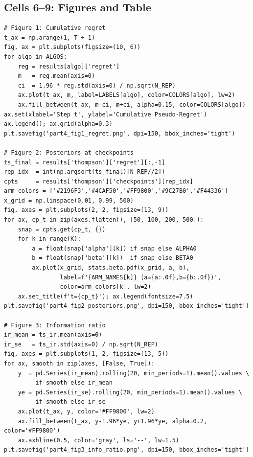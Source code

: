 \documentclass[11pt, letterpaper]{article}
\begin{document}
\subsection*{Cells 6--9: Figures and Table}
\begin{lstlisting}
# Figure 1: Cumulative regret
t_ax = np.arange(1, T + 1)
fig, ax = plt.subplots(figsize=(10, 6))
for algo in ALGOS:
    reg = results[algo]['regret']
    m   = reg.mean(axis=0)
    ci  = 1.96 * reg.std(axis=0) / np.sqrt(N_REP)
    ax.plot(t_ax, m, label=LABELS[algo], color=COLORS[algo], lw=2)
    ax.fill_between(t_ax, m-ci, m+ci, alpha=0.15, color=COLORS[algo])
ax.set(xlabel='Step t', ylabel='Cumulative Pseudo-Regret')
ax.legend(); ax.grid(alpha=0.3)
plt.savefig('part4_fig1_regret.png', dpi=150, bbox_inches='tight')

# Figure 2: Posteriors at checkpoints
ts_final = results['thompson']['regret'][:,-1]
rep_idx  = int(np.argsort(ts_final)[N_REP//2])
cpts     = results['thompson']['checkpoints'][rep_idx]
arm_colors = ['#2196F3','#4CAF50','#FF9800','#9C27B0','#F44336']
x_grid = np.linspace(0.01, 0.99, 500)
fig, axes = plt.subplots(2, 2, figsize=(13, 9))
for ax, cp_t in zip(axes.flatten(), [50, 100, 200, 500]):
    snap = cpts.get(cp_t, {})
    for k in range(K):
        a = float(snap['alpha'][k]) if snap else ALPHA0
        b = float(snap['beta'][k])  if snap else BETA0
        ax.plot(x_grid, stats.beta.pdf(x_grid, a, b),
                label=f'{ARM_NAMES[k]} (a={a:.0f},b={b:.0f})',
                color=arm_colors[k], lw=2)
    ax.set_title(f't={cp_t}'); ax.legend(fontsize=7.5)
plt.savefig('part4_fig2_posteriors.png', dpi=150, bbox_inches='tight')

# Figure 3: Information ratio
ir_mean = ts_ir.mean(axis=0)
ir_se   = ts_ir.std(axis=0) / np.sqrt(N_REP)
fig, axes = plt.subplots(1, 2, figsize=(13, 5))
for ax, smooth in zip(axes, [False, True]):
    y  = pd.Series(ir_mean).rolling(20, min_periods=1).mean().values \
         if smooth else ir_mean
    ye = pd.Series(ir_se).rolling(20, min_periods=1).mean().values \
         if smooth else ir_se
    ax.plot(t_ax, y, color='#FF9800', lw=2)
    ax.fill_between(t_ax, y-1.96*ye, y+1.96*ye, alpha=0.2, color='#FF9800')
    ax.axhline(0.5, color='gray', ls='--', lw=1.5)
plt.savefig('part4_fig3_info_ratio.png', dpi=150, bbox_inches='tight')
\end{lstlisting}
\end{document}

